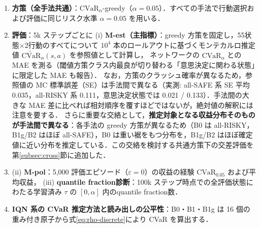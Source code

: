 \documentclass[a4paper,10pt]{jsarticle}
\theoremstyle{definition}
\newcommand{\CVaR}{\mathrm{CVaR}}
\begin{document}
\begin{enumerate}
\begin{itemize}
    \item \textbf{B1g 歪み FQF（$g$-一様初期化・主結果）}：B1 と同一だが，FPN の初期 bias を $g$-一様配置 $\tau_i = g^{-1}_{\alpha,\lambda}(i/N)$（実験Aの M1 相当）に初期化し，学習初期から下側裾に多くの quantile fraction を重点的に割り当てる．
    \item B2 リスク感応 IQN：学習時 $\tau\sim U(0,1)$ 16点，コサイン埋め込み64次元，行動選択時 $\tau\sim U(0,\alpha)$．
    \item \textbf{B2p IQN（学習時歪み $\tau$）}：B2 と同一の構造をもつが，\textbf{学習時のサンプリング（現在側の $\tau_i$ とターゲット側の $\tau'_j$ の双方）}のみ $\tau = g^{-1}_{\alpha,\lambda}(U(0,1))$ に変更し，学習時から原子を下側裾に集中させる対抗手法である（分位点 Huber 損失の level には現在側 $\tau_i$ を，ターゲット原子の生成にはターゲット側 $\tau'_j$ を用い，重要度重みは付与せず等重み $1/N$ で扱う）．行動選択（$\tau\sim U(0,\alpha)$）と決定的評価グリッドは B2 と完全同一である．
  \end{itemize}
  \item \textbf{方策（全手法共通）}：$\CVaR_\alpha$-greedy（$\alpha=0.05$）．すべての手法で行動選択および評価に同じリスク水準 $\alpha=0.05$ を用いる．
  \item \textbf{評価}：5k ステップごとに (i) \textbf{M-est（主指標）}：greedy 方策を固定し，55状態$\times$2行動のすべてについて $10^4$ 本のロールアウトに基づくモンテカルロ推定値 $\widetilde{\mathrm{CVaR}}_\alpha(s,a)$ を参照値として計算し，
  ネットワークの $\CVaR_\alpha$ との MAE を測る（閾値方策クラス内最良が切り替わる「意思決定に関わる状態」に限定した MAE も報告）．
  なお，方策のクラッシュ確率が異なるため，参照値の MC 標準誤差（SE）は手法間で異なる（実測: all-SAFE 系 SE 平均 0.035，all-RISKY 系 0.111，意思決定状態では 0.021 / 0.133）．手法間の大きな MAE 差に比べれば相対順序を覆すほどではないが，絶対値の解釈には注意を要する．
  さらに重要な交絡として，\textbf{推定対象となる収益分布そのものが手法間で異なる}：各手法の greedy 方策が異なるため（B0 は all-RISKY，B1g/B2 はほぼ all-SAFE），B0 は重い裾をもつ分布を，B1g/B2 はほぼ確定値に近い分布を推定している．この交絡を検討する共通方策下の交差評価を第\ref{subsec:cross}節に追加した．
  \item (ii) \textbf{M-pol}：5{,}000 評価エピソード（$\varepsilon=0$）の収益の経験 $\CVaR_{0.05}$ および平均収益，
  (iii) \textbf{quantile fraction診断}：100k ステップ時点での全評価状態にわたる学習済み $\tau$ の $[0,\alpha]$ 内のquantile fraction数．
  \item \textbf{IQN 系の CVaR 推定方法と読み出しの公平性}：B0・B1・B1g は 16 個の重み付き原子から式\eqref{eq:rho-discrete}により CVaR を算出する．

\end{enumerate}
\end{document}
